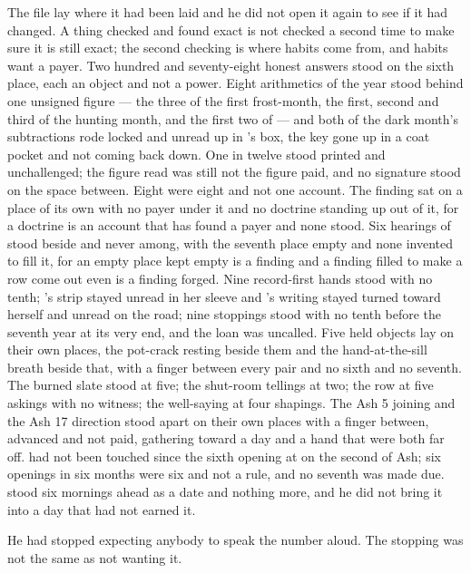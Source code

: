 The file lay where it had been laid and he did not open it again to see if it had changed. A thing checked and found exact is not checked a second time to make sure it is still exact; the second checking is where habits come from, and habits want a payer. Two hundred and seventy-eight honest answers stood on the sixth place, each an object and not a power. Eight arithmetics of the year stood behind one unsigned figure --- the three of the first frost-month, the first, second and third of the hunting month, and the first two of  --- and both of the dark month's subtractions rode locked and unread up  in 's box, the key gone up in a coat pocket and not coming back down. One in twelve stood printed and unchallenged; the figure read was still not the figure paid, and no signature stood on the space between. Eight were eight and not one account. The finding sat on a place of its own with no payer under it and no doctrine standing up out of it, for a doctrine is an account that has found a payer and none stood. Six hearings of  stood beside and never among, with the seventh place empty and none invented to fill it, for an empty place kept empty is a finding and a finding filled to make a row come out even is a finding forged. Nine record-first hands stood with no tenth; 's strip stayed unread in her sleeve and 's writing stayed turned toward herself and unread on the road; nine stoppings stood with no tenth before the seventh year at its very end, and the loan was uncalled. Five held objects lay on their own places, the pot-crack resting beside them and the hand-at-the-sill breath beside that, with a finger between every pair and no sixth and no seventh. The burned slate stood at five; the shut-room tellings at two; the row at five askings with no witness; the well-saying at four shapings. The Ash 5 joining and the Ash 17 direction stood apart on their own places with a finger between, advanced and not paid, gathering toward a day and a hand that were both far off.  had not been touched since the sixth opening at  on the second of Ash; six openings in six months were six and not a rule, and no seventh was made due.  stood six mornings ahead as a date and nothing more, and he did not bring it into a day that had not earned it.

He had stopped expecting anybody to speak the number aloud. The stopping was not the same as not wanting it.

